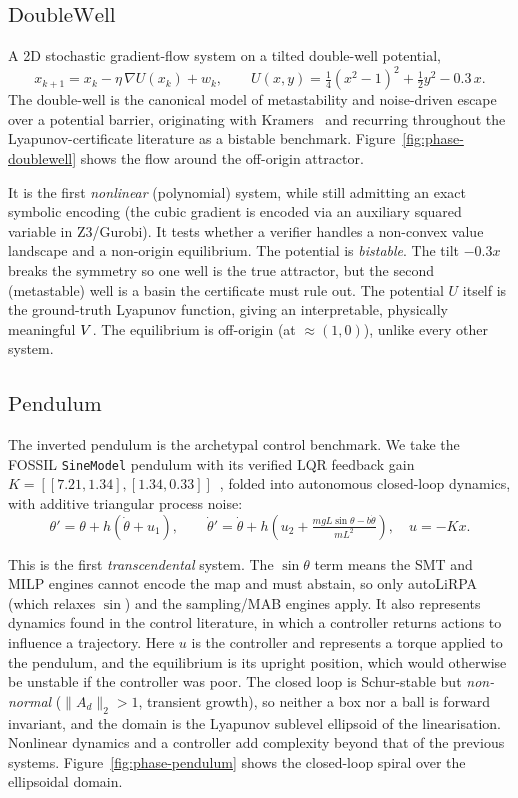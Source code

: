 \subsection{$\mathrm{DoubleWell}$}
\label{sec:bench-doublewell}

A 2D stochastic gradient-flow system on a tilted double-well potential,
\[
  x_{k+1} = x_k - \eta\,\nabla U(x_k) + w_k, \qquad
  U(x,y) = \tfrac14 (x^2 - 1)^2 + \tfrac12 y^2 - 0.3\,x .
\]
The double-well is the canonical model of metastability and noise-driven escape
over a potential barrier, originating with Kramers~\cite{kramers1940brownian} and
recurring throughout the Lyapunov-certificate literature as a bistable benchmark.
Figure~\ref{fig:phase-doublewell} shows the flow around the off-origin attractor.

It is the first \emph{nonlinear} (polynomial) system, while still
admitting an exact symbolic encoding (the cubic gradient is encoded via an
auxiliary squared variable in Z3/Gurobi). It tests whether a verifier handles a
non-convex value landscape and a non-origin equilibrium. The potential is
\emph{bistable}. The tilt $-0.3x$ breaks the symmetry so one well is the true
attractor, but the second (metastable) well is a basin the certificate must rule
out. The potential $U$ itself is the ground-truth Lyapunov function, giving an
interpretable, physically meaningful $V$. The equilibrium is off-origin (at
$\approx(1,0)$), unlike every other system.


\subsection{$\mathrm{Pendulum}$}
\label{sec:bench-pendulum-lqr}

The inverted pendulum is the archetypal control benchmark. We take the FOSSIL
\texttt{SineModel} pendulum with its verified LQR feedback gain $K = [[7.21,
1.34],[1.34, 0.33]]$~\cite{edwards2024fossil2, abate2021fossil},
folded into autonomous closed-loop dynamics, with additive triangular process
noise:
\[
  \theta' = \theta + h(\dot\theta + u_1), \qquad
  \dot\theta' = \dot\theta + h\!\left(u_2 + \tfrac{mgL\sin\theta - b\dot\theta}{mL^2}\right),
  \quad u = -Kx .
\]

This is the first \emph{transcendental} system. The $\sin\theta$ term means the
SMT and MILP engines cannot encode the map and must abstain, so only autoLiRPA
(which relaxes $\sin$) and the sampling/MAB engines apply. It also represents
dynamics found in the control literature, in which a controller returns actions
to influence a trajectory. Here $u$ is the controller and represents a torque
applied to the pendulum, and the equilibrium is its upright position, which would
otherwise be unstable if the controller was poor. The closed loop is Schur-stable but \emph{non-normal}
($\lVert A_d \rVert_2 > 1$, transient growth), so neither a box nor a ball is
forward invariant, and the domain is the Lyapunov sublevel ellipsoid of the
linearisation. Nonlinear dynamics and a controller add complexity beyond that of
the previous systems. Figure~\ref{fig:phase-pendulum} shows the closed-loop
spiral over the ellipsoidal domain.


\newpage
